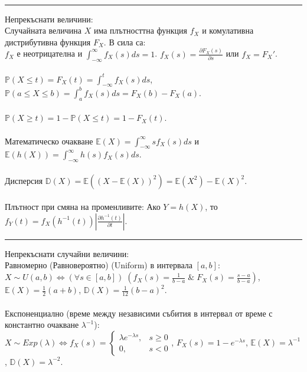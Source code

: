 \documentclass[10pt, a4paper]{article}
\newcommand{\prob}{\mathbb{P}}
\newcommand{\expect}{\mathbb{E}}
\newcommand{\disp}{\mathbb{D}}
\begin{document}
\\
\hrule
\vspace*{3mm}
Непрекъснати величини: \\
Случайната величина \(X\) има плътносттна функция \(f_X\) и комулативна дистрибутивна функция \(F_X\). В сила са: \\
\(f_X\) е неотрицателна и \(\displaystyle\int_{-\infty}^\infty f_X(s) ds = 1\).
\(f_X(s) = \displaystyle\frac{\partial F_X(s)}{\partial s}\) или \(f_X = F_X'\).
\\
\\
\(\prob(X \leq t) = F_X(t) = \displaystyle\int_{-\infty}^t f_X(s) ds\), \quad
\(\prob(a \leq X \leq b) = \displaystyle\int_{a}^b f_X(s) ds = F_X(b) - F_X(a)\).
\\
\\
\(\prob(X \geq t) = 1 - \prob(X \leq t) = 1 - F_X(t)\).
\\
\\
Математическо очакване \(\expect(X) = \displaystyle\int_{-\infty}^\infty s f_X(s) ds\)
и \(\expect(h(X)) = \displaystyle\int_{-\infty}^\infty h(s) f_X(s) ds\).
\\
\\
Дисперсия \(\disp(X) = \expect((X - \expect(X))^2) = \expect(X^2) - \expect(X)^2\).
\\
\\
Плътност при смяна на променливите: Ако \(Y = h(X)\),
то \(f_Y(t) = f_X(h^{-1}(t))\left|\displaystyle\frac{\partial h^{-1} (t)}{\partial t}\right|\).
\\
\hrule
\vspace*{3mm}
Непрекъснати случайни величини: \\
Равномерно (Равновероятно) (Uniform) в интервала \([a, b]\): \(X \sim U(a, b) \iff
(\forall s \in [a, b]) \; \left(f_X(s) = \displaystyle\frac{1}{b - a} \; \& \; F_X(s) = \displaystyle\frac{s - a}{b - a}\right)\), \\
\(\expect(X) = \frac{1}{2}(a + b)\), \quad \(\disp(X) = \frac{1}{12}(b - a)^2\).
\\
\\
Експоненциално (време между независими събития в интервал от време с константно очакване \(\lambda^{-1}\)): \\
\(X \sim Exp(\lambda) \iff f_X(s) = \begin{cases}
    \lambda e^{-\lambda s}, & s \geq 0 \\
    0 , & s < 0
\end{cases}\), \quad \(F_X(s) = 1 - e^{-\lambda s}\), \quad \(\expect(X) = \lambda^{-1}\), \quad \(\disp(X) = \lambda^{-2}\).
\end{document}
